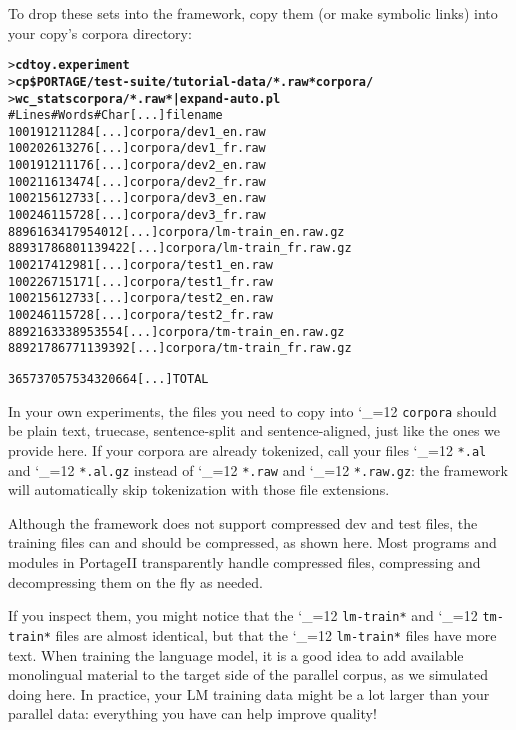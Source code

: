 \documentclass[11pt,letterpaper]{article}
\newcommand{\PS}{PortageII\xspace}
\def\code{\begingroup\catcode`\_=12 \codex}
\newcommand{\codex}[1]{\texttt{#1}\endgroup}
\begin{document}
To drop these sets into the framework, copy them (or make symbolic
links) into your copy's corpora directory:
\begin{small}
\begin{alltt}
   > \textbf{cd toy.experiment}
   > \textbf{cp \$PORTAGE/test-suite/tutorial-data/*.raw* corpora/}
   > \textbf{wc_stats corpora/*.raw* | expand-auto.pl}
      #Lines   #Words   #Char     [...]   filename
      100      1912     11284     [...]   corpora/dev1_en.raw
      100      2026     13276     [...]   corpora/dev1_fr.raw
      100      1912     11176     [...]   corpora/dev2_en.raw
      100      2116     13474     [...]   corpora/dev2_fr.raw
      100      2156     12733     [...]   corpora/dev3_en.raw
      100      2461     15728     [...]   corpora/dev3_fr.raw
      8896     163417   954012    [...]   corpora/lm-train_en.raw.gz
      8893     178680   1139422   [...]   corpora/lm-train_fr.raw.gz
      100      2174     12981     [...]   corpora/test1_en.raw
      100      2267     15171     [...]   corpora/test1_fr.raw
      100      2156     12733     [...]   corpora/test2_en.raw
      100      2461     15728     [...]   corpora/test2_fr.raw
      8892     163338   953554    [...]   corpora/tm-train_en.raw.gz
      8892     178677   1139392   [...]   corpora/tm-train_fr.raw.gz

      36573    705753   4320664   [...]   TOTAL
\end{alltt}
\end{small}

In your own experiments, the files you need to copy into \code{corpora}
should be plain text, truecase, sentence-split and sentence-aligned, just like
the ones we provide here. If your corpora are already tokenized, call your
files \code{*.al} and \code{*.al.gz} instead of \code{*.raw} and
\code{*.raw.gz}: the framework will automatically skip tokenization with those
file extensions.

Although the framework does not support compressed dev and test files, the
training files can and should be compressed, as shown here.  Most programs and
modules in \PS transparently handle compressed files, compressing and
decompressing them on the fly as needed.

If you inspect them, you might notice that the \code{lm-train*} and
\code{tm-train*} files are almost identical, but that the \code{lm-train*} files have
more text.  When training the language model, it is a good idea to add
available monolingual material to the target side of the parallel corpus, as we
simulated doing here.  In practice, your LM training data might be a lot larger
than your parallel data: everything you have can help improve quality!
\end{document}
